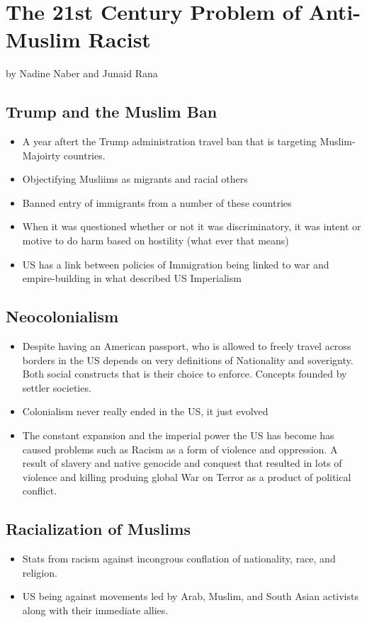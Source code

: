 \documentclass{article}
\begin{document}
  \section{The 21st Century Problem of Anti-Muslim Racist}
  by Nadine Naber and Junaid Rana

  \subsection{Trump and the Muslim Ban}
  \begin{itemize}
    \item A year aftert the Trump administration travel ban
      that is targeting Muslim-Majoirty countries.
    \item Objectifying Musliims as migrants and racial others
    \item Banned entry of immigrants from a number of these countries
    \item When it was questioned whether or not it was
      discriminatory, it was intent or motive to do harm based on hostility
      (what ever that means)
    \item US has a link between policies of Immigration being linked
      to war and empire-building in what described US Imperialism
  \end{itemize}

  \subsection{Neocolonialism}
  \begin{itemize}
    \item Despite having an American passport, who is allowed
      to freely travel across borders in the US depends on very
      definitions of Nationality and soverignty.
      Both social constructs that is their choice to enforce.
      Concepts founded by settler societies.
    \item Colonialism never really ended in the US, it just evolved
    \item The constant expansion and the imperial power the US
      has become has caused problems such as Racism as a form of
      violence and oppression.
      A result of slavery and native genocide and conquest that resulted
      in lots of violence and killing produing global War on Terror
      as a product of political conflict.
  \end{itemize}


  \subsection{Racialization of Muslims}
  \begin{itemize}
    \item Stats from racism against incongrous conflation
      of nationality, race, and religion.
    \item US being against movements led by Arab, Muslim, and South Asian
      activists along with their immediate allies.
  \end{itemize}
\end{document}
